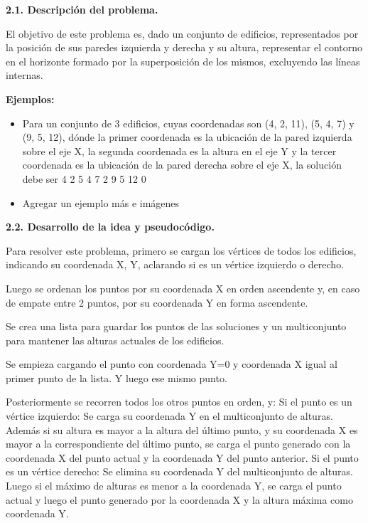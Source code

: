 \noindent
\textbf{2.1. Descripción del problema.}

\vspace*{0.3cm}

El objetivo de este problema es, dado un conjunto de edificios, representados
por la posición de sus paredes izquierda y derecha y su altura, representar el
contorno en el horizonte formado por la superposición de los mismos, excluyendo
las líneas internas. \medskip

\textbf{Ejemplos:}
\begin{itemize}
  \item Para un conjunto de 3 edificios, cuyas coordenadas son (4, 2, 11),
  (5, 4, 7) y (9, 5, 12), dónde la primer coordenada es la ubicación de la pared
  izquierda sobre el eje X, la segunda coordenada es la altura en el eje Y y la
  tercer coordenada es la ubicación de la pared derecha sobre el eje X, la
  solución debe ser 4 2 5 4 7 2 9 5 12 0
  \item Agregar un ejemplo más e imágenes
\end{itemize}


\vspace*{0.75cm} \noindent



\noindent
\textbf{2.2. Desarrollo de la idea y pseudocódigo.}

\vspace*{0.3cm}

Para resolver este problema, primero se cargan los vértices de todos los
edificios, indicando su coordenada X, Y, aclarando si es un vértice izquierdo o
derecho.

Luego se ordenan los puntos por su coordenada X en orden ascendente y, en caso
de empate entre 2 puntos, por su coordenada Y en forma ascendente.

Se crea una lista para guardar los puntos de las soluciones y un multiconjunto
para mantener las alturas actuales de los edificios.

Se empieza cargando el punto con coordenada Y=0 y coordenada X igual al primer
punto de la lista. Y luego ese mismo punto.

Posteriormente se recorren todos los otros puntos en orden, y:
Si el punto es un vértice izquierdo: Se carga su coordenada Y en el
multiconjunto de alturas. Además si su altura es mayor a la altura del último
punto, y su coordenada X es mayor a la correspondiente del último punto, se
carga el punto generado con la coordenada X del punto actual y la coordenada Y
del punto anterior.
Si el punto es un vértice derecho: Se elimina su coordenada Y del multiconjunto
de alturas. Luego si el máximo de alturas es menor a la coordenada Y, se carga
el punto actual y luego el punto generado por la coordenada X y la altura máxima
como coordenada Y.


